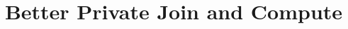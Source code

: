 \documentclass[sigconf,anonymous,review]{acmart}
\begin{document}
\raggedbottom

\title{Better Private Join and Compute}









\renewcommand{\shortauthors}{Anonymous}
\end{document}

